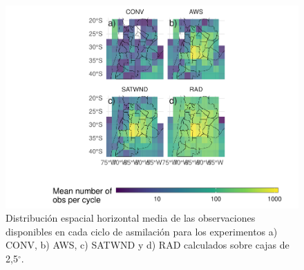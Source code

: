 \documentclass[12pt,oneside]{reedthesis}
\begin{document}
\begin{figure}
\includegraphics{thesis_files/figure-latex/obs-horizontal-1} \caption{Distribución espacial horizontal media de las observaciones disponibles en cada ciclo de asmilación para los experimentos a) CONV, b) AWS, c) SATWND y d) RAD calculados sobre cajas de 2,5\(^{\circ}\).}\label{fig:obs-horizontal}
\end{figure}
\end{document}
